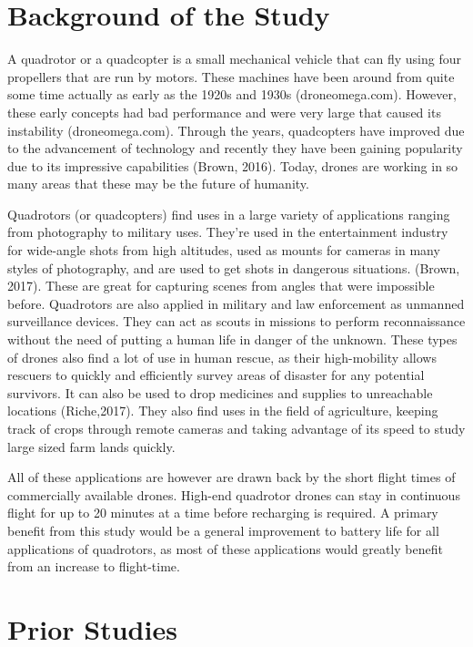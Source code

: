 \section{Background of the Study}

A quadrotor or a quadcopter is a small mechanical vehicle that can fly using four propellers that are run by motors. These machines have been around from quite some time actually as early as the 1920s and 1930s (droneomega.com). However, these early concepts had bad performance and were very large that caused its instability (droneomega.com). Through the years, quadcopters have improved due to the advancement of technology and recently they have been gaining popularity due to its impressive capabilities (Brown, 2016). Today, drones are working in so many areas that these may be the future of humanity.

Quadrotors (or quadcopters) find uses in a large variety of applications ranging from photography to military uses. They’re used in the entertainment industry for wide-angle shots from high altitudes, used as mounts for cameras in many styles of photography, and are used to get shots in dangerous situations. (Brown, 2017).  These are great for capturing scenes from angles that were impossible before. Quadrotors are also applied in military and law enforcement as unmanned surveillance devices. They can act as scouts in missions to perform reconnaissance without the need of putting a human life in danger of the unknown. These types of drones also find a lot of use in human rescue, as their high-mobility allows rescuers to quickly and efficiently survey areas of disaster for any potential survivors.  It can also be used to drop medicines and supplies to unreachable locations (Riche,2017). They also find uses in the field of agriculture, keeping track of crops through remote cameras and taking advantage of its speed to study large sized farm lands quickly.

All of these applications are however are drawn back by the short flight times of commercially available drones. High-end quadrotor drones can stay in continuous flight for up to 20 minutes at a time before recharging is required.  A primary benefit from this study would be a general improvement to battery life for all applications of quadrotors, as most of these applications would greatly benefit from an increase to flight-time.

\graytx{\Blindtext}


\section{Prior Studies}

